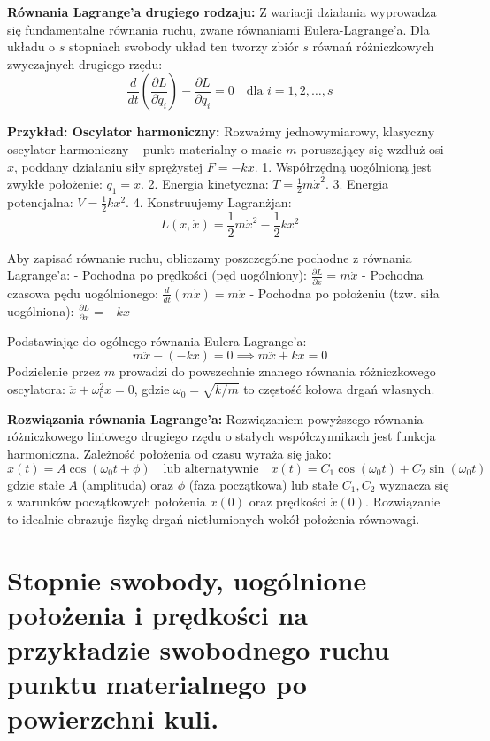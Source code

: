 \documentclass[11pt, a4paper]{article}
\begin{document}
\textbf{Równania Lagrange'a drugiego rodzaju:}
Z wariacji działania wyprowadza się fundamentalne równania ruchu, zwane równaniami Eulera-Lagrange'a. Dla układu o $s$ stopniach swobody układ ten tworzy zbiór $s$ równań różniczkowych zwyczajnych drugiego rzędu:
\[
\frac{d}{dt} \left( \frac{\partial L}{\partial \dot{q}_i} \right) - \frac{\partial L}{\partial q_i} = 0 \quad \text{dla } i = 1, 2, \dots, s
\]

\textbf{Przykład: Oscylator harmoniczny:}
Rozważmy jednowymiarowy, klasyczny oscylator harmoniczny – punkt materialny o masie $m$ poruszający się wzdłuż osi $x$, poddany działaniu siły sprężystej $F = -kx$. 
1. Współrzędną uogólnioną jest zwykłe położenie: $q_1 = x$.
2. Energia kinetyczna: $T = \frac{1}{2}m\dot{x}^2$.
3. Energia potencjalna: $V = \frac{1}{2}kx^2$.
4. Konstruujemy Lagranżjan:
\[
L(x, \dot{x}) = \frac{1}{2}m\dot{x}^2 - \frac{1}{2}kx^2
\]

Aby zapisać równanie ruchu, obliczamy poszczególne pochodne z równania Lagrange'a:
- Pochodna po prędkości (pęd uogólniony): $\frac{\partial L}{\partial \dot{x}} = m\dot{x}$
- Pochodna czasowa pędu uogólnionego: $\frac{d}{dt}(m\dot{x}) = m\ddot{x}$
- Pochodna po położeniu (tzw. siła uogólniona): $\frac{\partial L}{\partial x} = -kx$

Podstawiając do ogólnego równania Eulera-Lagrange'a:
\[
m\ddot{x} - (-kx) = 0 \implies m\ddot{x} + kx = 0
\]
Podzielenie przez $m$ prowadzi do powszechnie znanego równania różniczkowego oscylatora: $\ddot{x} + \omega_0^2 x = 0$, gdzie $\omega_0 = \sqrt{k/m}$ to częstość kołowa drgań własnych.

\textbf{Rozwiązania równania Lagrange'a:}
Rozwiązaniem powyższego równania różniczkowego liniowego drugiego rzędu o stałych współczynnikach jest funkcja harmoniczna. Zależność położenia od czasu wyraża się jako:
\[
x(t) = A \cos(\omega_0 t + \phi) \quad \text{lub alternatywnie} \quad x(t) = C_1 \cos(\omega_0 t) + C_2 \sin(\omega_0 t)
\]
gdzie stałe $A$ (amplituda) oraz $\phi$ (faza początkowa) lub stałe $C_1, C_2$ wyznacza się z warunków początkowych położenia $x(0)$ oraz prędkości $\dot{x}(0)$. Rozwiązanie to idealnie obrazuje fizykę drgań nietłumionych wokół położenia równowagi.

\section{Stopnie swobody, uogólnione położenia i prędkości na przykładzie swobodnego ruchu punktu materialnego po powierzchni kuli.}
\end{document}
